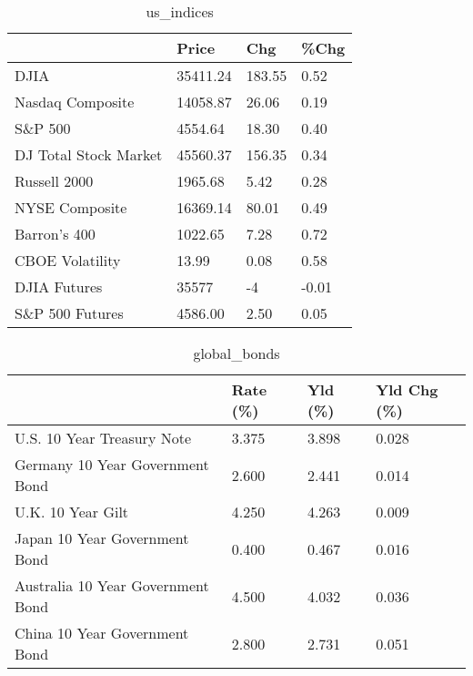 \documentclass{article}%
\begin{document}
%


\begin{table}[htbp]%
\caption{us\_indices}%
\centering%
\begin{adjustbox}{width=1\textwidth}%
\begin{tabular}{llll}
\toprule
                      &    Price &    Chg &  \%Chg \\
\midrule
                 DJIA & 35411.24 & 183.55 &  0.52 \\
     Nasdaq Composite & 14058.87 &  26.06 &  0.19 \\
              S\&P 500 &  4554.64 &  18.30 &  0.40 \\
DJ Total Stock Market & 45560.37 & 156.35 &  0.34 \\
         Russell 2000 &  1965.68 &   5.42 &  0.28 \\
       NYSE Composite & 16369.14 &  80.01 &  0.49 \\
         Barron's 400 &  1022.65 &   7.28 &  0.72 \\
      CBOE Volatility &    13.99 &   0.08 &  0.58 \\
         DJIA Futures &    35577 &     -4 & -0.01 \\
      S\&P 500 Futures &  4586.00 &   2.50 &  0.05 \\
\bottomrule
\end{tabular}
%
\end{adjustbox}%
\end{table}

%


\begin{table}[htbp]%
\caption{global\_bonds}%
\centering%
\begin{adjustbox}{width=1\textwidth}%
\begin{tabular}{llll}
\toprule
                                  & Rate (\%) & Yld (\%) & Yld Chg (\%) \\
\midrule
       U.S. 10 Year Treasury Note &    3.375 &   3.898 &       0.028 \\
  Germany 10 Year Government Bond &    2.600 &   2.441 &       0.014 \\
                U.K. 10 Year Gilt &    4.250 &   4.263 &       0.009 \\
    Japan 10 Year Government Bond &    0.400 &   0.467 &       0.016 \\
Australia 10 Year Government Bond &    4.500 &   4.032 &       0.036 \\
    China 10 Year Government Bond &    2.800 &   2.731 &       0.051 \\
\bottomrule
\end{tabular}
%
\end{adjustbox}%
\end{table}
\end{document}
